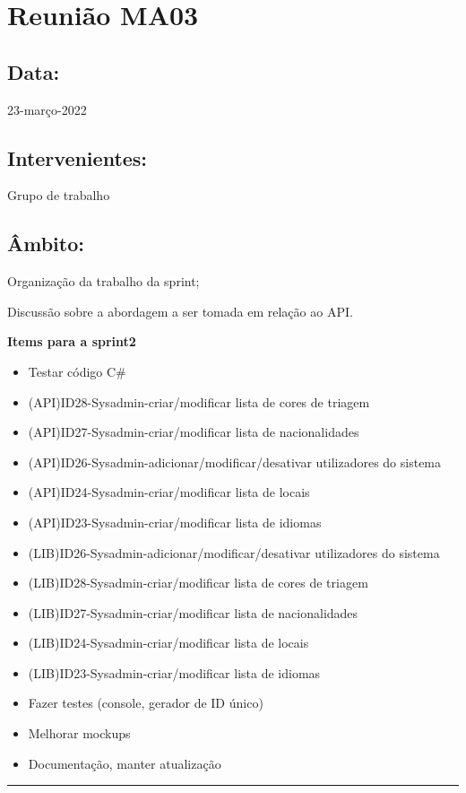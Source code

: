 \section{Reunião MA03}\label{reuniaoMA03}

\subsection*{Data:}
23-março-2022

\subsection*{Intervenientes:}
Grupo de trabalho

\subsection*{Âmbito:}
Organização da trabalho da sprint; 

Discussão sobre a abordagem a ser tomada em relação ao API.


\textbf{Items para a sprint2}


\begin{itemize}
	\item Testar código C\#
	\item (API)ID28-Sysadmin-criar/modificar lista de cores de triagem
	\item (API)ID27-Sysadmin-criar/modificar lista de nacionalidades
	\item (API)ID26-Sysadmin-adicionar/modificar/desativar utilizadores do sistema
	\item (API)ID24-Sysadmin-criar/modificar lista de locais
	\item (API)ID23-Sysadmin-criar/modificar lista de idiomas
	\item (LIB)ID26-Sysadmin-adicionar/modificar/desativar utilizadores do sistema
	\item (LIB)ID28-Sysadmin-criar/modificar lista de cores de triagem
	\item (LIB)ID27-Sysadmin-criar/modificar lista de nacionalidades
	\item (LIB)ID24-Sysadmin-criar/modificar lista de locais
	\item (LIB)ID23-Sysadmin-criar/modificar lista de idiomas
	\item Fazer testes (console, gerador de ID único)
	\item Melhorar mockups
	\item Documentação, manter atualização
\end{itemize}

\noindent \rule{\linewidth}{0.4pt}
\newline
